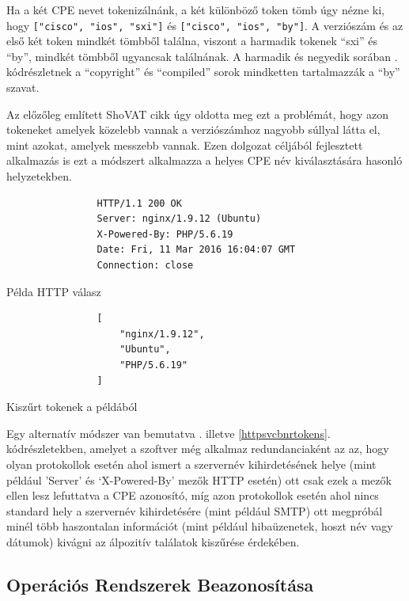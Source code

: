 \documentclass[a4paper,12pt]{article}
\begin{document}
	Ha a két CPE nevet tokenizálnánk, a két különböző token tömb úgy nézne ki, hogy \texttt{["cisco", "ios", "sxi"]} és \texttt{["cisco", "ios", "by"]}. A verziószám és az első két token mindkét tömbből találna, viszont a harmadik tokenek ``sxi'' és ``by'', mindkét tömbből ugyancsak találnának. A harmadik és negyedik sorában \az{\ref{ciscosvcbnr}}. kódrészletnek a ``copyright'' és ``compiled'' sorok mindketten tartalmazzák a ``by'' szavat.

	Az előzőleg említett ShoVAT\cite{shovat15} cikk úgy oldotta meg ezt a problémát, hogy azon tokeneket amelyek közelebb vannak a verziószámhoz nagyobb súllyal látta el, mint azokat, amelyek messzebb vannak. Ezen dolgozat céljából fejlesztett alkalmazás is ezt a módszert alkalmazza a helyes CPE név kiválasztására hasonló helyzetekben.
	
	\begin{multicols}{2}
		\begin{listing}[H]
			\begin{verbatim}
				HTTP/1.1 200 OK
				Server: nginx/1.9.12 (Ubuntu)
				X-Powered-By: PHP/5.6.19
				Date: Fri, 11 Mar 2016 16:04:07 GMT
				Connection: close
			\end{verbatim}
			\caption{Példa HTTP válasz}
			\label{httpsvcbnr}
		\end{listing}
		\begin{listing}[H]
			\begin{verbatim}
				[
					"nginx/1.9.12",
					"Ubuntu",
					"PHP/5.6.19"
				]
			\end{verbatim}
			\caption{Kiszűrt tokenek a példából}
			\label{httpsvcbnrtokens}
		\end{listing}
	\end{multicols}
	
	Egy alternatív módszer van bemutatva \az{\ref{httpsvcbnr}}. illetve \ref{httpsvcbnrtokens}. kódrészletekben, amelyet a szoftver még alkalmaz redundanciaként az az, hogy olyan protokollok esetén ahol ismert a szervernév kihirdetésének helye (mint például 'Server' és `X-Powered-By' mezők HTTP esetén) ott csak ezek a mezők ellen lesz lefuttatva a CPE azonosító, míg azon protokollok esetén ahol nincs standard hely a szervernév kihirdetésére (mint például SMTP) ott megpróbál minél több haszontalan információt (mint például hibaüzenetek, hoszt név vagy dátumok) kivágni az álpozitív találatok kiszűrése érdekében.

\subsection{Operációs Rendszerek Beazonosítása} \label{ssec:opsysmatcher}
\end{document}
